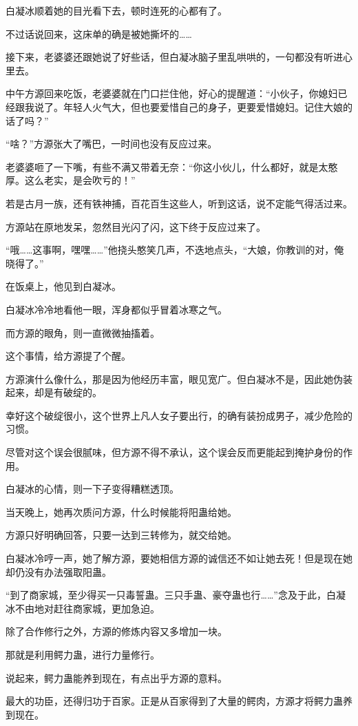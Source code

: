 \begin{this_body}
白凝冰顺着她的目光看下去，顿时连死的心都有了。

不过话说回来，这床单的确是被她撕坏的……

接下来，老婆婆还跟她说了好些话，但白凝冰脑子里乱哄哄的，一句都没有听进心里去。

中午方源回来吃饭，老婆婆就在门口拦住他，好心的提醒道：“小伙子，你媳妇已经跟我说了。年轻人火气大，但也要爱惜自己的身子，更要爱惜媳妇。记住大娘的话了吗？”

“啥？”方源张大了嘴巴，一时间也没有反应过来。

老婆婆咂了一下嘴，有些不满又带着无奈：“你这小伙儿，什么都好，就是太憨厚。这么老实，是会吹亏的！”

若是古月一族，还有铁神捕，百花百生这些人，听到这话，说不定能气得活过来。

方源站在原地发呆，忽然目光闪了闪，这下终于反应过来了。

“哦……这事啊，嘿嘿……”他挠头憨笑几声，不迭地点头，“大娘，你教训的对，俺晓得了。”

在饭桌上，他见到白凝冰。

白凝冰冷冷地看他一眼，浑身都似乎冒着冰寒之气。

而方源的眼角，则一直微微抽搐着。

这个事情，给方源提了个醒。

方源演什么像什么，那是因为他经历丰富，眼见宽广。但白凝冰不是，因此她伪装起来，却是有破绽的。

幸好这个破绽很小，这个世界上凡人女子要出行，的确有装扮成男子，减少危险的习惯。

尽管对这个误会很腻味，但方源不得不承认，这个误会反而更能起到掩护身份的作用。

白凝冰的心情，则一下子变得糟糕透顶。

当天晚上，她再次质问方源，什么时候能将阳蛊给她。

方源只好明确回答，只要一达到三转修为，就交给她。

白凝冰冷哼一声，她了解方源，要她相信方源的诚信还不如让她去死！但是现在她却仍没有办法强取阳蛊。

“到了商家城，至少得买一只毒誓蛊。三只手蛊、豪夺蛊也行……”念及于此，白凝冰不由地对赶往商家城，更加急迫。

除了合作修行之外，方源的修炼内容又多增加一块。

那就是利用鳄力蛊，进行力量修行。

说起来，鳄力蛊能养到现在，有点出乎方源的意料。

最大的功臣，还得归功于百家。正是从百家得到了大量的鳄肉，方源才将鳄力蛊养到现在。


\end{this_body}

